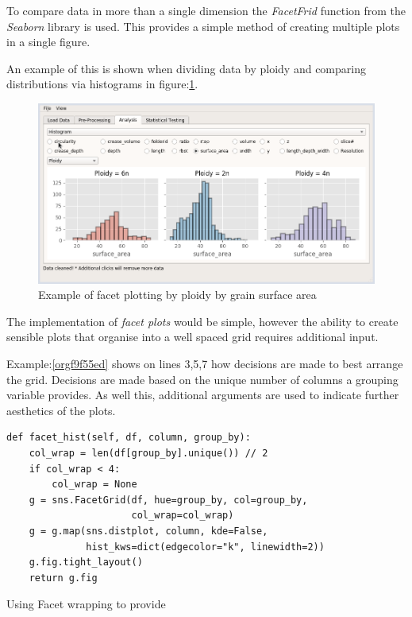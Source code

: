 \documentclass[11pt]{report}
\begin{document}
To compare data in more than a single dimension the \emph{FacetFrid} function from the \emph{Seaborn} library is used. This provides a simple method of creating multiple plots in a single figure.

An example of this is shown when dividing data by ploidy and comparing distributions via histograms in figure:\ref{fig:org8a72839}.

\begin{figure}[htbp]
\centering
\includegraphics[width=12cm]{./images/facet_example.png}
\caption{\label{fig:org8a72839}
Example of facet plotting by ploidy by grain surface area}
\end{figure}

The implementation of \emph{facet plots} would be simple, however the ability to create sensible plots that organise into a well spaced grid requires additional input.

Example:\ref{orgf9f55ed} shows on lines 3,5,7 how decisions are made to best arrange the grid. Decisions are made based on the unique number of columns a grouping variable provides. As well this,  additional arguments are  used to indicate further aesthetics of the plots.

\begin{listing}[htbp]
\begin{verbatim}
def facet_hist(self, df, column, group_by):
    col_wrap = len(df[group_by].unique()) // 2
    if col_wrap < 4:
        col_wrap = None
    g = sns.FacetGrid(df, hue=group_by, col=group_by,
                      col_wrap=col_wrap)
    g = g.map(sns.distplot, column, kde=False,
              hist_kws=dict(edgecolor="k", linewidth=2))
    g.fig.tight_layout()
    return g.fig
\end{verbatim}
\caption{\label{orgf9f55ed}
Using Facet wrapping to provide}
\end{listing}
\end{document}
